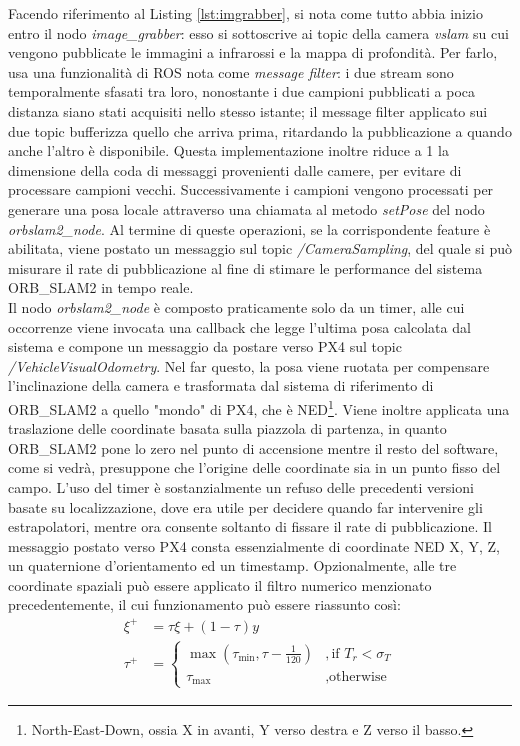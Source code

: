 Facendo riferimento al Listing \ref{lst:imgrabber}, si nota come tutto abbia inizio entro il nodo \emph{image\_grabber}: esso si sottoscrive ai topic della camera \emph{vslam} su cui vengono pubblicate le immagini a infrarossi e la mappa di profondità. Per farlo, usa una funzionalità di ROS nota come \emph{message filter}: i due stream sono temporalmente sfasati tra loro, nonostante i due campioni pubblicati a poca distanza siano stati acquisiti nello stesso istante; il message filter applicato sui due topic bufferizza quello che arriva prima, ritardando la pubblicazione a quando anche l'altro è disponibile. Questa implementazione inoltre riduce a 1 la dimensione della coda di messaggi provenienti dalle camere, per evitare di processare campioni vecchi. Successivamente i campioni vengono processati per generare una posa locale attraverso una chiamata al metodo \emph{setPose} del nodo \emph{orbslam2\_node}. Al termine di queste operazioni, se la corrispondente feature è abilitata, viene postato un messaggio sul topic \emph{/CameraSampling}, del quale si può misurare il rate di pubblicazione al fine di stimare le performance del sistema ORB\_SLAM2 in tempo reale.\\
Il nodo \emph{orbslam2\_node} è composto praticamente solo da un timer, alle cui occorrenze viene invocata una callback che legge l'ultima posa calcolata dal sistema e compone un messaggio da postare verso PX4 sul topic \emph{/VehicleVisualOdometry}. Nel far questo, la posa viene ruotata per compensare l'inclinazione della camera e trasformata dal sistema di riferimento di ORB\_SLAM2 a quello "mondo" di PX4, che è NED\footnote{North-East-Down, ossia X in avanti, Y verso destra e Z verso il basso.}. Viene inoltre applicata una traslazione delle coordinate basata sulla piazzola di partenza, in quanto ORB\_SLAM2 pone lo zero nel punto di accensione mentre il resto del software, come si vedrà, presuppone che l'origine delle coordinate sia in un punto fisso del campo. L'uso del timer è sostanzialmente un refuso delle precedenti versioni basate su localizzazione, dove era utile per decidere quando far intervenire gli estrapolatori, mentre ora consente soltanto di fissare il rate di pubblicazione. Il messaggio postato verso PX4 consta essenzialmente di coordinate NED X, Y, Z, un quaternione d'orientamento ed un timestamp. Opzionalmente, alle tre coordinate spaziali può essere applicato il filtro numerico menzionato precedentemente, il cui funzionamento può essere riassunto così:
\begin{subequations}
\begin{align}
    \xi^+ &= \tau\xi + (1 - \tau)y\\
    \tau^+ &=
    \begin{cases}
        \max(\tau_{\min}, \tau - \frac{1}{120}) &, \text{if  $T_r<\sigma_T$}\\
        \tau_{\max} &, \text{otherwise}
    \end{cases}
\end{align}
\end{subequations}
